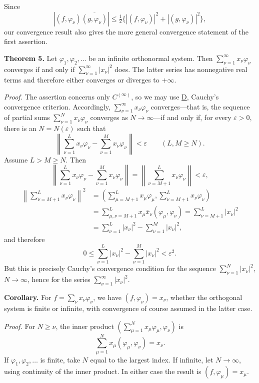 \documentclass[fontsize=13pt,twoside,openany,headings=normal,parskip=false,bookmarkpackage=false,DIV=calc]{scrbook}
\begin{document}
Since
\[
|(f,\varphi_\nu)\overline{(g,\varphi_\nu)}|
\leq\tfrac12\bigl\{|(f,\varphi_\nu)|^2+|(g,\varphi_\nu)|^2\bigr\},
\]
our convergence result also gives the more general convergence statement of the first assertion.

\leavevmode{}\textbf{Theorem 5.}\label{thm:II.5} Let $\varphi_1,\varphi_2,\ldots$ be an infinite orthonormal system. Then $\sum_{\nu=1}^\infty x_\nu\varphi_\nu$ converges if and only if $\sum_{\nu=1}^\infty|x_\nu|^2$ does. The latter series has nonnegative real terms and therefore either converges or diverges to $+\infty$.

\emph{Proof.} The assertion concerns only \hyperref[ax:II.Cinfty]{$C^{(\infty)}$}, so we may use \hyperref[ax:II.D]{D}, Cauchy's convergence criterion. Accordingly, $\sum_{\nu=1}^\infty x_\nu\varphi_\nu$ converges---that is, the sequence of partial sums $\sum_{\nu=1}^Nx_\nu\varphi_\nu$ converges as $N\to\infty$---if and only if, for every $\varepsilon>0$, there is an $N=N(\varepsilon)$ such that
\[
\left\|\sum_{\nu=1}^Lx_\nu\varphi_\nu-
\sum_{\nu=1}^Mx_\nu\varphi_\nu\right\|<\varepsilon
\qquad(L,M\geq N).
\]
Assume $L>M\geq N$. Then
\[
\left\|\sum_{\nu=1}^Lx_\nu\varphi_\nu-
\sum_{\nu=1}^Mx_\nu\varphi_\nu\right\|
=\left\|\sum_{\nu=M+1}^Lx_\nu\varphi_\nu\right\|<\varepsilon,
\]
\begin{align*}
\left\|\sum_{\nu=M+1}^Lx_\nu\varphi_\nu\right\|^2
&=\left(\sum_{\mu=M+1}^Lx_\mu\varphi_\mu,
\sum_{\nu=M+1}^Lx_\nu\varphi_\nu\right)\\
&=\sum_{\mu,\nu=M+1}^Lx_\mu\bar x_\nu(\varphi_\mu,\varphi_\nu)
=\sum_{\nu=M+1}^L|x_\nu|^2\\
&=\sum_{\nu=1}^L|x_\nu|^2-\sum_{\nu=1}^M|x_\nu|^2,
\end{align*}
and therefore
\[
0\leq\sum_{\nu=1}^L|x_\nu|^2-\sum_{\nu=1}^M|x_\nu|^2<\varepsilon^2.
\]
But this is precisely Cauchy's convergence condition for the sequence $\sum_{\nu=1}^N|x_\nu|^2$, $N\to\infty$, hence for the series $\sum_{\nu=1}^\infty|x_\nu|^2$.

\textbf{Corollary.} For $f=\sum_\nu x_\nu\varphi_\nu$, we have $(f,\varphi_\nu)=x_\nu$, whether the orthogonal system is finite or infinite, with convergence of course assumed in the latter case.

\hypertarget{origpage-28}{}%
\emph{Proof.} For $N\geq\nu$, the inner product $(\sum_{\mu=1}^Nx_\mu\varphi_\mu,\varphi_\nu)$ is
\[
\sum_{\mu=1}^Nx_\mu(\varphi_\mu,\varphi_\nu)=x_\nu.
\]
If $\varphi_1,\varphi_2,\ldots$ is finite, take $N$ equal to the largest index. If infinite, let $N\to\infty$, using continuity of the inner product. In either case the result is $(f,\varphi_\mu)=x_\mu$.
\end{document}
